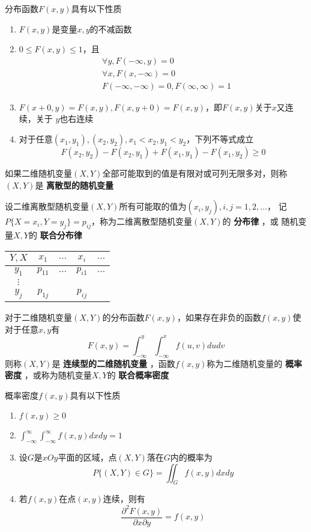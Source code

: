 \documentclass[11pt]{article}
\begin{document}
分布函数\(F(x,y)\)具有以下性质
\begin{enumerate}
\item \(F(x,y)\)是变量\(x,y\)的不减函数
\item \(0\le F(x,y)\le 1\)，且
\begin{align*}
&\forall y,F(-\infty,y)=0\\
&\forall x,F(x,-\infty)=0\\
&F(-\infty,-\infty)=0,F(\infty,\infty)=1
\end{align*}
\item \(F(x+0,y)=F(x,y),F(x,y+0)=F(x,y)\)，即\(F(x,y)\)关于\(x\)又连续，关于
\(y\)也右连续
\item 对于任意\((x_1,y_1),(x_2,y_2),x_1<x_2,y_1<y_2\)，下列不等式成立
\begin{equation*}
F(x_2,y_2)-F(x_2,y_1)+F(x_1,y_1)-F(x_1,y_2)\ge0
\end{equation*}
\end{enumerate}


如果二维随机变量\((X,Y)\)全部可能取到的值是有限对或可列无限多对，则称
\((X,Y)\)是 \textbf{离散型的随机变量}

设二维离散型随机变量\((X,Y)\)所有可能取的值为\((x_i,y_j),i,j=1,2,\dots\)，
记\(P\{X=x_i,Y=y_j\}=p_{ij}\)，称为二维离散型随机变量\((X,Y)\)的 \textbf{分布律} ，或
随机变量\(X,Y\)的 \textbf{联合分布律}

\begin{center}
\begin{tabular}{c|cccc}
\(Y,X\) & \(x_1\) & \(\dots\) & \(x_i\) & \(\dots\)\\
\hline
\(y_1\) & \(p_{11}\) & \(\dots\) & \(p_{i1}\) & \(\dots\)\\
\(\vdots\) &  &  &  & \\
\(y_j\) & \(p_{1j}\) &  & \(p_{ij}\) & \\
\end{tabular}
\end{center}

对于二维随机变量\((X,Y)\)的分布函数\(F(x,y)\)，如果存在非负的函数\(f(x,y)\)使
对于任意\(x,y\)有
\begin{equation*}
F(x,y)=\int_{-\infty}^y\int_{-\infty}^xf(u,v)dudv
\end{equation*}
则称\((X,Y)\)是 \textbf{连续型的二维随机变量} ，函数\(f(x,y)\)称为二维随机变量的 \textbf{概率
密度} ，或称为随机变量\(X,Y\)的 \textbf{联合概率密度}

概率密度\(f(x,y)\)具有以下性质
\begin{enumerate}
\item \(f(x,y)\ge0\)
\item \(\int_{-\infty}^\infty\int_{-\infty}^\infty f(x,y)dxdy=1\)
\item 设\(G\)是\(xOy\)平面的区域，点\((X,Y)\)落在\(G\)内的概率为
\begin{equation*}
P\{(X,Y)\in G\}=\iint_Gf(x,y)dxdy
\end{equation*}
\item 若\(f(x,y)\)在点\((x,y)\)连续，则有
\begin{equation*}
\frac{\partial ^2F(x,y)}{\partial x\partial y}=f(x,y)
\end{equation*}
\end{enumerate}
\end{document}
